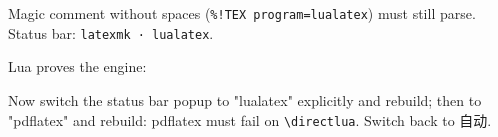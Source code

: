 \documentclass{article}
\begin{document}
Magic comment without spaces (\verb|%!TEX program=lualatex|) must still parse.
Status bar: \texttt{latexmk · lualatex}.

Lua proves the engine: 

Now switch the status bar popup to "lualatex" explicitly and rebuild; then to
"pdflatex" and rebuild: pdflatex must fail on \verb|\directlua|. Switch back to 自动.
\end{document}

